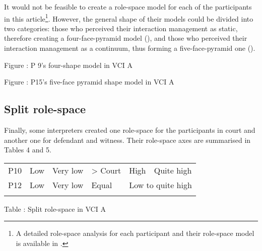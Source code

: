 \documentclass[output=paper]{langsci/langscibook}
\begin{document}
It would not be feasible to create a role-space model for each of the participants in this article\footnote{A detailed role-space analysis for each participant and their role-space model is available in \citet{Devaux2017b}.}. However, the general shape of their models could be divided into two categories: those who perceived their interaction management as static, therefore creating a four-face-pyramid model (), and those who perceived their interaction management as a continuum, thus forming a five-face-pyramid one ().  

  
 

\begin{stylecaption}
Figure : P 9's four-shape model in VCI A
\end{stylecaption}

  
 

\begin{stylecaption}
Figure : P15's five-face pyramid shape model in VCI A
\end{stylecaption}

\subsection{Split role-space}

Finally, some interpreters created one role-space for the participants in court and another one for defendant and witness. Their role-space axes are summarised in Tables 4 and 5. 

\begin{tabularx}{\textwidth}{XXXXXX}
\lsptoprule
P10 & Low & Very low & > Court & High & Quite high\\
P12 & Low & Very low & Equal & \multicolumn{2}{X}{Low to quite high}\\
\lspbottomrule
\end{tabularx}
\begin{stylecaption}
Table : Split role-space in VCI A
\end{stylecaption}
\end{document}
